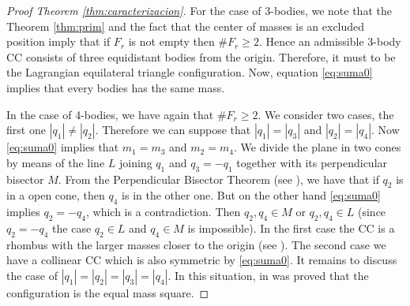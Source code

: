 \documentclass[twoside]{article}
\theoremstyle{remark}
\begin{document}
\begin{proof}[Proof Theorem \ref{thm:caracterizacion}]
For the case of 3-bodies, we note that the Theorem \ref{thm:prim} and the fact that the center of masses is an excluded position imply that if $F_r$ is not empty then $\# F_r\geq 2$. Hence an admissible 3-body CC consists of three equidistant bodies from the origin. Therefore, it must to be the Lagrangian equilateral triangle configuration. Now, equation \eqref{eq:suma0} implies that every bodies has the same mass.

In the case of 4-bodies, we have again that $\# F_r\geq 2$.  We consider two cases, the first one  $|q_1|\neq|q_2|$.  Therefore we can suppose that $|q_1|=|q_3|$ and $|q_2|=|q_4|$. Now \eqref{eq:suma0} implies that
 $m_1=m_3$ and $m_2=m_4$.  We divide the plane in two cones by means of  the line $L$ joining $q_1$  and $q_3=-q_1$ together with its perpendicular bisector $M$.  From the Perpendicular Bisector Theorem (see \cite{moeckel1990central}), we have that if  $q_2$  is in a open cone, then  $q_4$ is in the other one. But on the other hand \eqref{eq:suma0} implies $q_2=-q_4$, which is a contradiction. Then $q_2,q_4\in M$ or $q_2,q_4\in L$ (since $q_2=-q_4$ the case $q_2\in L$ and $q_4\in M$ is impossible). In the first case the CC is a rhombus with the larger masses closer to the origin (see  \cite{perez2007convex}). The second case we have a collinear CC which is also symmetric by  \eqref{eq:suma0}.
 It remains to discuss the case of $|q_1|=|q_2|=|q_3|=|q_4|$. In this situation, in \cite{hampton2005co} was proved that the configuration is the equal mass square.

\end{proof} 
\end{document}

